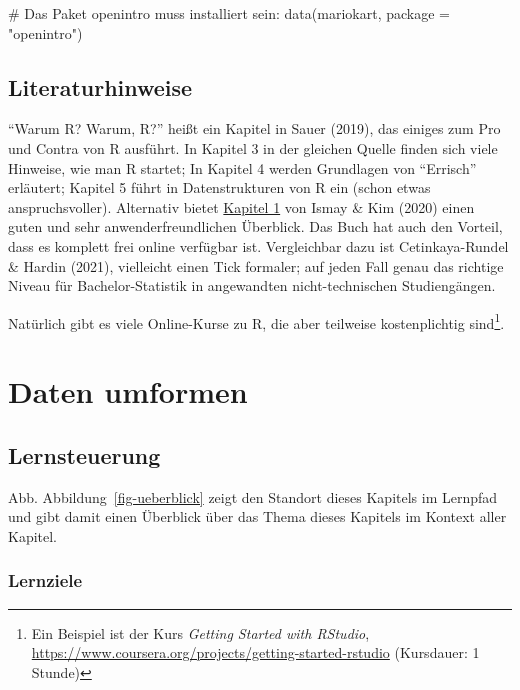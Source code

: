 \documentclass[
  a4paper,
]{scrbook}
\newenvironment{Shaded}{\begin{snugshade}}{\end{snugshade}}
\newcommand{\AttributeTok}[1]{\textcolor[rgb]{0.40,0.45,0.13}{#1}}
\newcommand{\CommentTok}[1]{\textcolor[rgb]{0.37,0.37,0.37}{#1}}
\newcommand{\FunctionTok}[1]{\textcolor[rgb]{0.28,0.35,0.67}{#1}}
\newcommand{\NormalTok}[1]{\textcolor[rgb]{0.00,0.23,0.31}{#1}}
\newcommand{\StringTok}[1]{\textcolor[rgb]{0.13,0.47,0.30}{#1}}
\theoremstyle{definition}
\theoremstyle{definition}
\theoremstyle{definition}
\theoremstyle{remark}
\begin{document}
\begin{Shaded}
\begin{Highlighting}[]
\CommentTok{\# Das Paket \textquotesingle{}openintro\textquotesingle{} muss installiert sein:}
\FunctionTok{data}\NormalTok{(mariokart, }\AttributeTok{package =} \StringTok{"openintro"}\NormalTok{) }
\end{Highlighting}
\end{Shaded}

\section{Literaturhinweise}\label{literaturhinweise-1}

``Warum R? Warum, R?'' heißt ein Kapitel in Sauer (2019), das einiges
zum Pro und Contra von R ausführt. In Kapitel 3 in der gleichen Quelle
finden sich viele Hinweise, wie man R startet; In Kapitel 4 werden
Grundlagen von ``Errisch'' erläutert; Kapitel 5 führt in Datenstrukturen
von R ein (schon etwas anspruchsvoller). Alternativ bietet
\href{https://moderndive.com/1-getting-started.html}{Kapitel 1} von
Ismay \& Kim (2020) einen guten und sehr anwenderfreundlichen Überblick.
Das Buch hat auch den Vorteil, dass es komplett frei online verfügbar
ist. Vergleichbar dazu ist Cetinkaya-Rundel \& Hardin (2021), vielleicht
einen Tick formaler; auf jeden Fall genau das richtige Niveau für
Bachelor-Statistik in angewandten nicht-technischen Studiengängen.

Natürlich gibt es viele Online-Kurse zu R, die aber teilweise
kostenplichtig sind\footnote{Ein Beispiel ist der Kurs \emph{Getting
  Started with RStudio},
  \url{https://www.coursera.org/projects/getting-started-rstudio}
  (Kursdauer: 1 Stunde)}.

\chapter{Daten umformen}\label{daten-umformen}

\section{Lernsteuerung}\label{lernsteuerung-2}

Abb. Abbildung~\ref{fig-ueberblick} zeigt den Standort dieses Kapitels
im Lernpfad und gibt damit einen Überblick über das Thema dieses
Kapitels im Kontext aller Kapitel.

\subsection{Lernziele}\label{lernziele-3}
\end{document}
